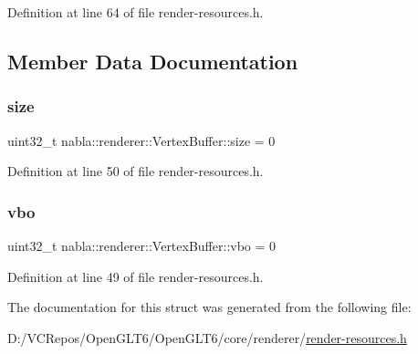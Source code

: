 Definition at line 64 of file render-\/resources.\+h.



\subsection{Member Data Documentation}
\mbox{\label{structnabla_1_1renderer_1_1_vertex_buffer_a994712714282a9bf4a7d2c9d2b4472d5}} 
\subsubsection{\texorpdfstring{size}{size}}
{\footnotesize\ttfamily uint32\+\_\+t nabla\+::renderer\+::\+Vertex\+Buffer\+::size = 0}



Definition at line 50 of file render-\/resources.\+h.

\mbox{\label{structnabla_1_1renderer_1_1_vertex_buffer_ac5880e8fd501c1166000351454c54235}} 
\subsubsection{\texorpdfstring{vbo}{vbo}}
{\footnotesize\ttfamily uint32\+\_\+t nabla\+::renderer\+::\+Vertex\+Buffer\+::vbo = 0}



Definition at line 49 of file render-\/resources.\+h.



The documentation for this struct was generated from the following file\+:\begin{DoxyCompactItemize}
\item 
D\+:/\+V\+C\+Repos/\+Open\+G\+L\+T6/\+Open\+G\+L\+T6/core/renderer/\mbox{\hyperlink{render-resources_8h}{render-\/resources.\+h}}\end{DoxyCompactItemize}
